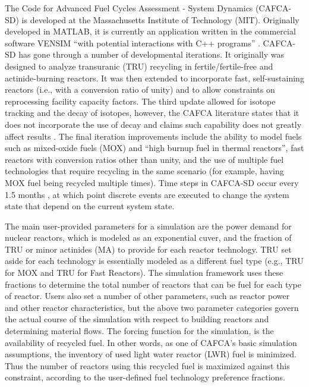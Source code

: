 The Code for Advanced Fuel Cycles Assessment - System Dynamics (CAFCA-SD) is
developed at the Massachusetts Institute of Technology (MIT). Originally
developed in MATLAB, it is currently an application written in the commercial
software VENSIM \cite{vensim_2010_ventana} ``with potential interactions with
C++ programs'' \cite{guerin_benchmark_2009}. CAFCA-SD has gone through a number
of developmental iterations. It originally was designed to analyze transuranic
(TRU) recycling in fertile/fertile-free and actinide-burning reactors. It was
then extended to incorporate fast, self-sustaining reactors (i.e., with a
conversion ratio of unity) and to allow constraints on reprocessing facility
capacity factors. The third update allowed for isotope tracking and the decay of
isotopes, however, the CAFCA literature states that it does not incorporate the
use of decay and claims such capability does not greatly affect results
\cite{guerin_impact_2009,guerin_benchmark_2009}. The final iteration
improvements include the ability to model fuels such as mixed-oxide fuels (MOX)
and ``high burnup fuel in thermal reactors'', fast reactors with conversion
ratios other than unity, and the use of multiple fuel technologies that require
recycling in the same scenario (for example, having MOX fuel being recycled
multiple times). Time steps in CAFCA-SD occur every 1.5
months \cite{guerin_impact_2009}, at which point discrete events are executed to
change the system state that depend on the current system state.

The main user-provided parameters for a simulation are the power demand for
nuclear reactors, which is modeled as an exponential cuver, and the fraction of
TRU or minor actinides (MA) to provide for each reactor technology. TRU set
aside for each technology is essentially modeled as a different fuel type
(e.g., TRU for MOX and TRU for Fast Reactors). The simulation framework uses
these fractions to determine the total number of reactors that can be fuel for
each type of reactor. Users also set a number of other parameters, such as
reactor power and other reactor characteristics, but the above two parameter
categories govern the actual course of the simulation with respect to building
reactors and determining material flows. The forcing function for the
simulation, is the availability of recycled fuel. In other words, as one of
CAFCA's basic simulation assumptions, the inventory of used light water reactor
(LWR) fuel is minimized. Thus the number of reactors using this recycled fuel is
maximized against this constraint, according to the user-defined fuel technology
preference fractions. 

